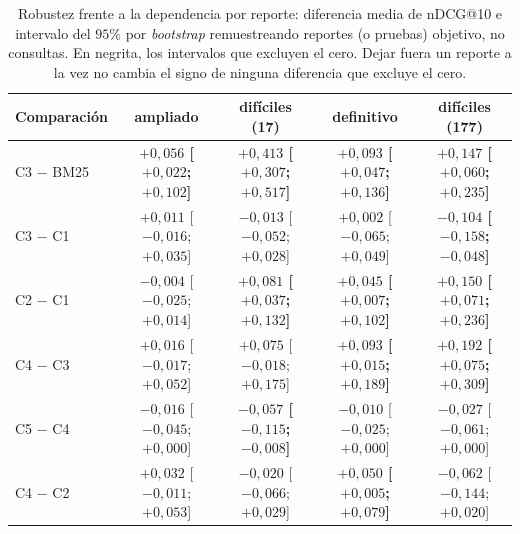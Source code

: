 \documentclass[11pt,letterpaper]{article}
\numberwithin{equation}{section}
\begin{document}
\begin{table}[htbp]
\centering
\scriptsize
\setlength{\tabcolsep}{3pt}
\renewcommand{\arraystretch}{1.25}
\caption{Robustez frente a la dependencia por reporte: diferencia media de nDCG@10 e intervalo del $95\%$ por \textit{bootstrap} remuestreando reportes (o pruebas) objetivo, no consultas. En negrita, los intervalos que excluyen el cero. Dejar fuera un reporte a la vez no cambia el signo de ninguna diferencia que excluye el cero.}
\label{tab:robustez}
\begin{tabularx}{\textwidth}{@{}l C C C C@{}}
\toprule
\textbf{Comparación} & \textbf{ampliado} & \textbf{difíciles (17)} & \textbf{definitivo} & \textbf{difíciles (177)} \\
\midrule
C3 $-$ BM25 & {\boldmath\bfseries $+0{,}056$ [$+0{,}022$; $+0{,}102$]} & {\boldmath\bfseries $+0{,}413$ [$+0{,}307$; $+0{,}517$]} & {\boldmath\bfseries $+0{,}093$ [$+0{,}047$; $+0{,}136$]} & {\boldmath\bfseries $+0{,}147$ [$+0{,}060$; $+0{,}235$]} \\
C3 $-$ C1 & $+0{,}011$ [$-0{,}016$; $+0{,}035$] & $-0{,}013$ [$-0{,}052$; $+0{,}028$] & $+0{,}002$ [$-0{,}065$; $+0{,}049$] & {\boldmath\bfseries $-0{,}104$ [$-0{,}158$; $-0{,}048$]} \\
C2 $-$ C1 & $-0{,}004$ [$-0{,}025$; $+0{,}014$] & {\boldmath\bfseries $+0{,}081$ [$+0{,}037$; $+0{,}132$]} & {\boldmath\bfseries $+0{,}045$ [$+0{,}007$; $+0{,}102$]} & {\boldmath\bfseries $+0{,}150$ [$+0{,}071$; $+0{,}236$]} \\
C4 $-$ C3 & $+0{,}016$ [$-0{,}017$; $+0{,}052$] & $+0{,}075$ [$-0{,}018$; $+0{,}175$] & {\boldmath\bfseries $+0{,}093$ [$+0{,}015$; $+0{,}189$]} & {\boldmath\bfseries $+0{,}192$ [$+0{,}075$; $+0{,}309$]} \\
C5 $-$ C4 & $-0{,}016$ [$-0{,}045$; $+0{,}000$] & {\boldmath\bfseries $-0{,}057$ [$-0{,}115$; $-0{,}008$]} & $-0{,}010$ [$-0{,}025$; $+0{,}000$] & $-0{,}027$ [$-0{,}061$; $+0{,}000$] \\
C4 $-$ C2 & $+0{,}032$ [$-0{,}011$; $+0{,}053$] & $-0{,}020$ [$-0{,}066$; $+0{,}029$] & {\boldmath\bfseries $+0{,}050$ [$+0{,}005$; $+0{,}079$]} & $-0{,}062$ [$-0{,}144$; $+0{,}020$] \\
\bottomrule
\end{tabularx}
\end{table}
\end{document}
